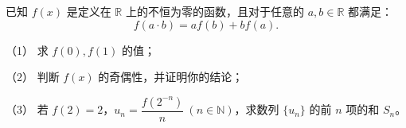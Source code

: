 \begin{question}
已知 \(f(x)\) 是定义在 \(\mathbb R\) 上的不恒为零的函数，且对于任意的 \(a,b\in\mathbb R\) 都满足：
\nopagebreak[4]
\[
f(a\cdot b)=af(b)+bf(a).
\]

（1） 求 \(f(0),f(1)\) 的值；

（2） 判断 \(f(x)\) 的奇偶性，并证明你的结论；

（3） 若 \(f(2)=2\)，\(u_n=\dfrac{f(2^{-n})}{n}\ (n\in\mathbb N)\)，求数列 \(\{u_n\}\) 的前 \(n\) 项的和 \(S_n\)。

\end{question}